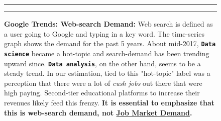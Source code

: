 \documentclass[]{article}
\begin{document}
\begin{figure}[!ht]
    \label{fig:google-demand}
    \begin{center}
    \end{center}
        \hrule
        \vspace{2mm}
    \caption{ \textbf{Google Trends: Web-search Demand:} \newline \footnotesize { Web search is defined as a user going to Google and typing in a key word.  The time-series graph shows the demand for the past 5 years.  About mid-2017, \textbf{\tt{Data science}} became a hot-topic and search-demand has been trending upward since.  \textbf{\tt{Data analysis}}, on the other hand, seems to be a steady trend.   \newline \newline In our estimation, tied to this "hot-topic" label was a perception that there were a lot of \emph{cush jobs} out there that were high paying.  Second-tier educational platforms to increase their revenues likely feed this frenzy. \newline \newline \textbf{It is essential to emphasize that this is web-search demand, not \underline{Job Market Demand}.}     }  }
    \vspace{2mm}
    \hrule
\end{figure}
\end{document}
